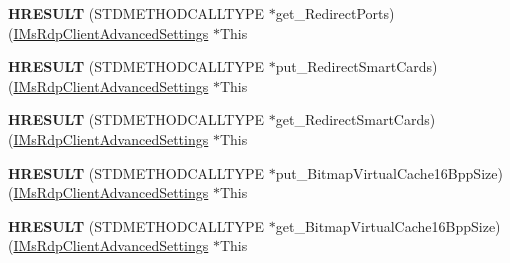 \begin{DoxyCompactItemize}
\item 
\mbox{\label{struct_m_s_t_s_c_lib_1_1_i_ms_rdp_client_advanced_settings_vtbl_a3b1bc5633f8d524c68e8ae23fa6ab4cc}} 
{\bfseries H\+R\+E\+S\+U\+LT} (S\+T\+D\+M\+E\+T\+H\+O\+D\+C\+A\+L\+L\+T\+Y\+PE $\ast$get\+\_\+\+Redirect\+Ports)(\hyperlink{interface_m_s_t_s_c_lib_1_1_i_ms_rdp_client_advanced_settings}{I\+Ms\+Rdp\+Client\+Advanced\+Settings} $\ast$This
\item 
\mbox{\label{struct_m_s_t_s_c_lib_1_1_i_ms_rdp_client_advanced_settings_vtbl_a4dfe40df1274b955ec31d4ebe16b86b6}} 
{\bfseries H\+R\+E\+S\+U\+LT} (S\+T\+D\+M\+E\+T\+H\+O\+D\+C\+A\+L\+L\+T\+Y\+PE $\ast$put\+\_\+\+Redirect\+Smart\+Cards)(\hyperlink{interface_m_s_t_s_c_lib_1_1_i_ms_rdp_client_advanced_settings}{I\+Ms\+Rdp\+Client\+Advanced\+Settings} $\ast$This
\item 
\mbox{\label{struct_m_s_t_s_c_lib_1_1_i_ms_rdp_client_advanced_settings_vtbl_ad8273a720a4e4d8ed1a897b46e7a1ff1}} 
{\bfseries H\+R\+E\+S\+U\+LT} (S\+T\+D\+M\+E\+T\+H\+O\+D\+C\+A\+L\+L\+T\+Y\+PE $\ast$get\+\_\+\+Redirect\+Smart\+Cards)(\hyperlink{interface_m_s_t_s_c_lib_1_1_i_ms_rdp_client_advanced_settings}{I\+Ms\+Rdp\+Client\+Advanced\+Settings} $\ast$This
\item 
\mbox{\label{struct_m_s_t_s_c_lib_1_1_i_ms_rdp_client_advanced_settings_vtbl_adf177285f02ff98f05c2c3a3e080b2c1}} 
{\bfseries H\+R\+E\+S\+U\+LT} (S\+T\+D\+M\+E\+T\+H\+O\+D\+C\+A\+L\+L\+T\+Y\+PE $\ast$put\+\_\+\+Bitmap\+Virtual\+Cache16\+Bpp\+Size)(\hyperlink{interface_m_s_t_s_c_lib_1_1_i_ms_rdp_client_advanced_settings}{I\+Ms\+Rdp\+Client\+Advanced\+Settings} $\ast$This
\item 
\mbox{\label{struct_m_s_t_s_c_lib_1_1_i_ms_rdp_client_advanced_settings_vtbl_ad06c2194b1a3ee982ada7ab84cf597cd}} 
{\bfseries H\+R\+E\+S\+U\+LT} (S\+T\+D\+M\+E\+T\+H\+O\+D\+C\+A\+L\+L\+T\+Y\+PE $\ast$get\+\_\+\+Bitmap\+Virtual\+Cache16\+Bpp\+Size)(\hyperlink{interface_m_s_t_s_c_lib_1_1_i_ms_rdp_client_advanced_settings}{I\+Ms\+Rdp\+Client\+Advanced\+Settings} $\ast$This

\end{DoxyCompactItemize}
